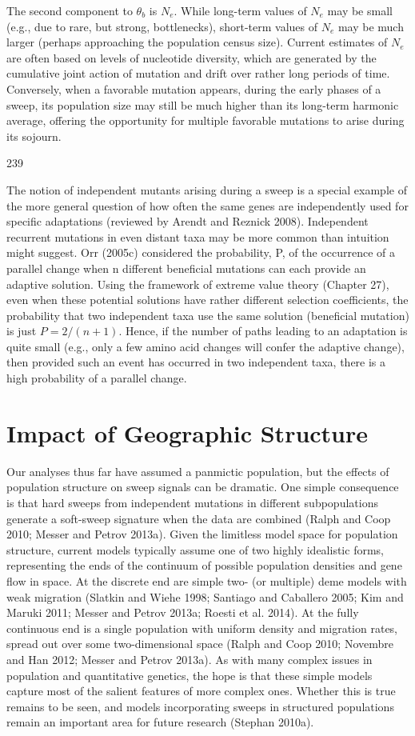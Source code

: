 \documentclass{article}
\begin{document}
The second component to  $ \theta_{b} $ is  $ N_{e} $. While long-term values of  $ N_{e} $ may be small (e.g., due to rare, but strong, bottlenecks), short-term values of  $ N_{e} $ may be much larger (perhaps approaching the population census size). Current estimates of  $ N_{e} $ are often based on levels of nucleotide diversity, which are generated by the cumulative joint action of mutation and drift over rather long periods of time. Conversely, when a favorable mutation appears, during the early phases of a sweep, its population size may still be much higher than its long-term harmonic average, offering the opportunity for multiple favorable mutations to arise during its sojourn.

239

The notion of independent mutants arising during a sweep is a special example of the more general question of how often the same genes are independently used for specific adaptations (reviewed by Arendt and Reznick 2008). Independent recurrent mutations in even distant taxa may be more common than intuition might suggest. Orr (2005c) considered the probability, P, of the occurrence of a parallel change when n different beneficial mutations can each provide an adaptive solution. Using the framework of extreme value theory (Chapter 27), even when these potential solutions have rather different selection coefficients, the probability that two independent taxa use the same solution (beneficial mutation) is just  $ P = 2/(n + 1) $. Hence, if the number of paths leading to an adaptation is quite small (e.g., only a few amino acid changes will confer the adaptive change), then provided such an event has occurred in two independent taxa, there is a high probability of a parallel change.

\section{Impact of Geographic Structure}
Our analyses thus far have assumed a panmictic population, but the effects of population structure on sweep signals can be dramatic. One simple consequence is that hard sweeps from independent mutations in different subpopulations generate a soft-sweep signature when the data are combined (Ralph and Coop 2010; Messer and Petrov 2013a). Given the limitless model space for population structure, current models typically assume one of two highly idealistic forms, representing the ends of the continuum of possible population densities and gene flow in space. At the discrete end are simple two- (or multiple) deme models with weak migration (Slatkin and Wiehe 1998; Santiago and Caballero 2005; Kim and Maruki 2011; Messer and Petrov 2013a; Roesti et al. 2014). At the fully continuous end is a single population with uniform density and migration rates, spread out over some two-dimensional space (Ralph and Coop 2010; Novembre and Han 2012; Messer and Petrov 2013a). As with many complex issues in population and quantitative genetics, the hope is that these simple models capture most of the salient features of more complex ones. Whether this is true remains to be seen, and models incorporating sweeps in structured populations remain an important area for future research (Stephan 2010a).
\end{document}
